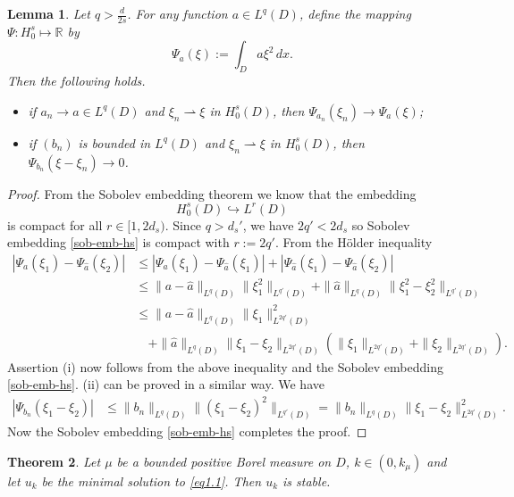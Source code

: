\documentclass[11pt,a4paper,reqno]{amsart}
\newtheorem{theorem}{\bf Theorem}[section]
\newtheorem{lemma}[theorem]{\bf Lemma}
\theoremstyle{definition}
\numberwithin{equation}{section}
\begin{document}
\begin{lemma}
\label{hs-compact}
Let $q>\frac{d}{2s}$. For any function   $a\in L^q(D)$,  define the mapping $\Psi:H^s_0\mapsto\mathbb{R}$ by
\[
\Psi_a(\xi):=\int_D a\xi^2\,dx. 
\]
Then the following holds.
\begin{itemize}
 \item[(i)] if $a_n\to a\in L^q(D)$ and $\xi_n \rightharpoonup \xi$ in $H^s_0(D)$, then $\Psi_{a_n}(\xi_n)\to \Psi_a(\xi)$;
 \item[(ii)] if $(b_n)$ is bounded in $L^q(D)$ and $\xi_n \rightharpoonup \xi$ in $H^s_0(D)$, then $\Psi_{b_n}(\xi-\xi_n)\to 0$.
 \end{itemize}
\end{lemma}
\begin{proof}
From the Sobolev embedding theorem we know that the embedding
\begin{equation}\label{sob-emb-hs}
H^s_0(D)\hookrightarrow L^r(D)
\end{equation}
is compact for all $r\in [1,2d_s)$. Since $q>d_s'$, we have $2q'<2d_s$ so Sobolev embedding \eqref{sob-emb-hs} is compact with $r:=2q'$.
From the H\"older inequality
\[
\begin{split}
|\Psi_a(\xi_1)-\Psi_{\hat a}(\xi_2)|&\leq|\Psi_a(\xi_1)-\Psi_{\hat a}(\xi_1)|+|\Psi_{\hat a}(\xi_1)-\Psi_{\hat a}(\xi_2)|
\\&\le 
\|a-\hat a\|_{L^q(D)} \|\xi^2_1\|_{L^{q'}(D)}+ \|\hat a\|_{L^q(D)} \|\xi^2_1-\xi^2_2\|_{L^{q'}(D)}\\&
\le \|a-\hat a\|_{L^q(D)} \|\xi_1\|^2_{L^{2q'}(D)}\\&\quad+
\|\hat a\|_{L^q(D)}\|\xi_1-\xi_2\|_{L^{2q'}(D)}(\|\xi_1\|_{L^{2q'}(D)}+\|\xi_2\|_{L^{2q'}(D)}).
\end{split}
\]
Assertion (i) now follows from the above inequality and   the Sobolev embedding \eqref{sob-emb-hs}.
(ii) can be proved in a similar way. We have
\[
\begin{split}
|\Psi_{b_n}(\xi_1-\xi_2)|&\le \|b_n\|_{L^q(D)} \|(\xi_1-\xi_2)^2\|_{L^{q'}(D)}=
 \|b_n\|_{L^q(D)} \|\xi_1-\xi_2\|_{L^{2q'}(D)}^{2}.
\end{split}
\]
Now the Sobolev embedding \eqref{sob-emb-hs} completes the proof.
\end{proof}
\begin{theorem}
\label{stability}
Let  $\mu$ be a bounded positive Borel measure on $D$,  $k\in(0,k_\mu)$ and let $u_k$ be the minimal solution to \eqref{eq1.1}. Then $u_k$ is stable.
\end{theorem}
\end{document}
